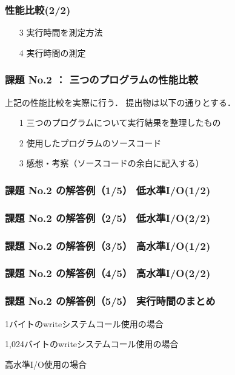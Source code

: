 \documentclass{beamer}                 %
\begin{document}
\begin{frame}
  \frametitle{性能比較(2/2)}
  \begin{enumerate}
  \item[3] 実行時間を測定方法
  \item[4] 実行時間の測定
  \end{enumerate}
\end{frame}

\begin{frame}[fragile]
\frametitle{課題 No.2 ： 三つのプログラムの性能比較}
上記の性能比較を実際に行う．
提出物は以下の通りとする．

\begin{enumerate}
\item[1] 三つのプログラムについて実行結果を整理したもの
\item[2] 使用したプログラムのソースコード
\item[3] 感想・考察（ソースコードの余白に記入する）
\end{enumerate}
\end{frame}

\begin{frame}[fragile]
\frametitle{課題 No.2 の解答例（1/5） 低水準I/O(1/2)}
\end{frame}

\begin{frame}[fragile]
\frametitle{課題 No.2 の解答例（2/5） 低水準I/O(2/2)}
\end{frame}

\begin{frame}[fragile]
\frametitle{課題 No.2 の解答例（3/5） 高水準I/O(1/2)}
\end{frame}

\begin{frame}[fragile]
\frametitle{課題 No.2 の解答例（4/5） 高水準I/O(2/2)}
\end{frame}

\begin{frame}[fragile]
\frametitle{課題 No.2 の解答例（5/5） 実行時間のまとめ}

{\small  1バイトのwriteシステムコール使用の場合}

{\small 1,024バイトのwriteシステムコール使用の場合}

{\small 高水準I/O使用の場合}

\end{frame}
\end{document}
